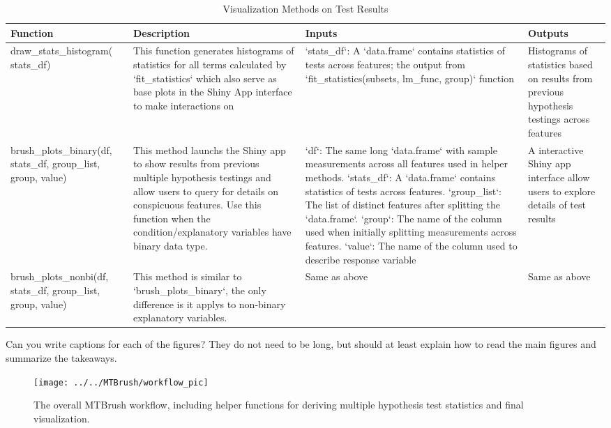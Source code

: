 \begin{Schunk}
\begin{table}

\caption{\label{tab:unnamed-chunk-4}Visualization Methods on Test Results}
\centering
\begin{tabu} to 
\hline
Function & Description & Inputs & Outputs\\
\hline
draw\_stats\_histogram( stats\_df) & This function generates histograms of statistics for all terms calculated by `fit\_statistics` which also serve as base plots in the Shiny App interface to make interactions on & `stats\_df`: A `data.frame` contains statistics of tests across features; the output from `fit\_statistics(subsets, lm\_func, group)` function & Histograms of statistics based on results from previous hypothesis testings across features\\
\hline
brush\_plots\_binary(df, stats\_df, group\_list, group, value) & This method launchs the Shiny app to show results from previous multiple hypothesis testings and allow users to query for details on conspicuous features. Use this function when the condition/explanatory variables have binary data type. & `df`: The same long `data.frame` with sample measurements across all features used in helper methods. `stats\_df`: A `data.frame` contains statistics of tests across features. `group\_list`: The list of distinct features after splitting the `data.frame`. `group`: The name of the column used when initially splitting measurements across features. `value`: The name of the column used to describe response variable & A interactive Shiny app interface allow users to explore details of test results\\
\hline
brush\_plots\_nonbi(df, stats\_df, group\_list, group, value) & This method is similar to `brush\_plots\_binary`, the only difference is it applys to non-binary explanatory variables. & Same as above & Same as above\\
\hline
\end{tabu}
\end{table}

\end{Schunk}

\color{violet}

Can you write captions for each of the figures? They do not need to be
long, but should at least explain how to read the main figures and
summarize the takeaways. \color{black}

\begin{Schunk}
\begin{figure}
\texttt{[image: ../../MTBrush/workflow\_pic]} \caption[The overall MTBrush workflow, including helper functions for deriving multiple hypothesis test statistics and final visualization]{The overall MTBrush workflow, including helper functions for deriving multiple hypothesis test statistics and final visualization.}\label{fig:unnamed-chunk-5}
\end{figure}
\end{Schunk}

